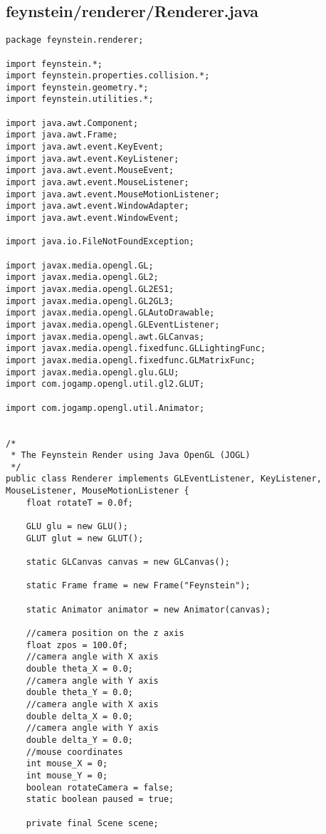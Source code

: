 \subsection*{feynstein/renderer/Renderer.java}
\begin{lstlisting}
package feynstein.renderer;

import feynstein.*;
import feynstein.properties.collision.*;
import feynstein.geometry.*;
import feynstein.utilities.*;

import java.awt.Component;
import java.awt.Frame;
import java.awt.event.KeyEvent;
import java.awt.event.KeyListener;
import java.awt.event.MouseEvent;
import java.awt.event.MouseListener;
import java.awt.event.MouseMotionListener;
import java.awt.event.WindowAdapter;
import java.awt.event.WindowEvent;
 
import java.io.FileNotFoundException;

import javax.media.opengl.GL;
import javax.media.opengl.GL2;
import javax.media.opengl.GL2ES1;
import javax.media.opengl.GL2GL3;
import javax.media.opengl.GLAutoDrawable;
import javax.media.opengl.GLEventListener;
import javax.media.opengl.awt.GLCanvas;
import javax.media.opengl.fixedfunc.GLLightingFunc;
import javax.media.opengl.fixedfunc.GLMatrixFunc;
import javax.media.opengl.glu.GLU;
import com.jogamp.opengl.util.gl2.GLUT; 
 
import com.jogamp.opengl.util.Animator;


/*
 * The Feynstein Render using Java OpenGL (JOGL)
 */
public class Renderer implements GLEventListener, KeyListener, MouseListener, MouseMotionListener {
    float rotateT = 0.0f;
	
    GLU glu = new GLU();
    GLUT glut = new GLUT();

    static GLCanvas canvas = new GLCanvas();
 
    static Frame frame = new Frame("Feynstein");
 
    static Animator animator = new Animator(canvas);
	
    //camera position on the z axis
    float zpos = 100.0f;
    //camera angle with X axis
    double theta_X = 0.0;
    //camera angle with Y axis
    double theta_Y = 0.0;
    //camera angle with X axis
    double delta_X = 0.0;
    //camera angle with Y axis
    double delta_Y = 0.0;
    //mouse coordinates
    int mouse_X = 0;
    int mouse_Y = 0;
    boolean rotateCamera = false;
    static boolean paused = true;
	
    private final Scene scene;
 

\end{lstlisting}
